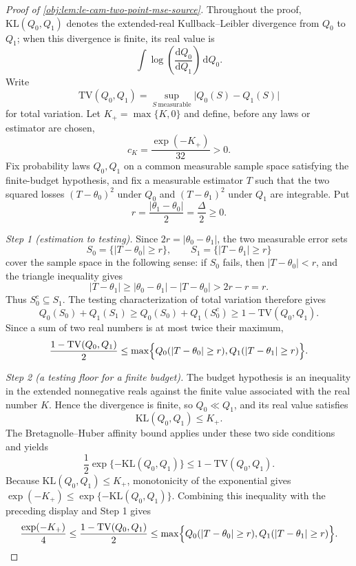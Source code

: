 \begin{proof}[Proof of \cref{obj:lem:le-cam-two-point-mse-source}]
Throughout the proof, \(\mathrm{KL}(Q_0,Q_1)\) denotes the extended-real
Kullback--Leibler divergence from \(Q_0\) to \(Q_1\); when this divergence is finite, its real value is
\[
\int \log\!\left(\frac{\mathrm d Q_0}{\mathrm d Q_1}\right)\,\mathrm dQ_0 .
\]
Write
\[
\mathrm{TV}(Q_0,Q_1)
=
\sup_{S\ \mathrm{measurable}}\bigl|Q_0(S)-Q_1(S)\bigr|
\]
for total variation. Let \(K_+=\max\{K,0\}\) and define, before any laws or estimator are chosen,
\[
c_K=\frac{\exp(-K_+)}{32}>0 .
\]
Fix probability laws \(Q_0,Q_1\) on a common measurable sample space satisfying the finite-budget
hypothesis, and fix a measurable estimator \(T\) such that the two squared losses
\((T-\theta_0)^2\) under \(Q_0\) and \((T-\theta_1)^2\) under \(Q_1\) are integrable. Put
\[
r=\frac{|\theta_1-\theta_0|}{2}=\frac{\Delta}{2}\ge 0 .
\]

\emph{Step 1 (estimation to testing).} Since \(2r=|\theta_0-\theta_1|\), the two measurable error
sets
\[
S_0=\{|T-\theta_0|\ge r\},
\qquad
S_1=\{|T-\theta_1|\ge r\}
\]
cover the sample space in the following sense: if \(S_0\) fails, then
\(|T-\theta_0|<r\), and the triangle inequality gives
\[
|T-\theta_1|\ge |\theta_0-\theta_1|-|T-\theta_0|>2r-r=r .
\]
Thus \(S_0^c\subseteq S_1\). The testing characterization of total variation therefore gives
\[
Q_0(S_0)+Q_1(S_1)
\ge
Q_0(S_0)+Q_1(S_0^c)
\ge
1-\mathrm{TV}(Q_0,Q_1).
\]
Since a sum of two real numbers is at most twice their maximum,
\[
\frac{1-\mathrm{TV}(Q_0,Q_1)}{2}
\le
\max\Bigl\{
Q_0(|T-\theta_0|\ge r),
Q_1(|T-\theta_1|\ge r)
\Bigr\}.
\]

\emph{Step 2 (a testing floor for a finite budget).} The budget hypothesis is an inequality in the
extended nonnegative reals against the finite value associated with the real number \(K\). Hence the
divergence is finite, so \(Q_0\ll Q_1\), and its real value satisfies
\[
\mathrm{KL}(Q_0,Q_1)\le K_+ .
\]
The Bretagnolle--Huber affinity bound applies under these two side conditions and yields
\[
\frac12\exp\{-\mathrm{KL}(Q_0,Q_1)\}
\le
1-\mathrm{TV}(Q_0,Q_1).
\]
Because \(\mathrm{KL}(Q_0,Q_1)\le K_+\), monotonicity of the exponential gives
\(\exp(-K_+)\le \exp\{-\mathrm{KL}(Q_0,Q_1)\}\). Combining this inequality with the preceding
display and Step 1 gives
\[
\frac{\exp(-K_+)}{4}
\le
\frac{1-\mathrm{TV}(Q_0,Q_1)}{2}
\le
\max\Bigl\{
Q_0(|T-\theta_0|\ge r),
Q_1(|T-\theta_1|\ge r)
\Bigr\}.
\]


\end{proof}
